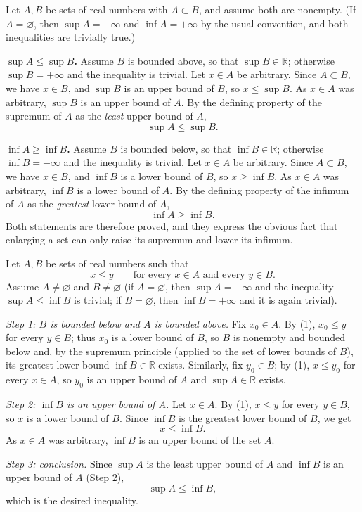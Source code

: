 \documentclass[11pt,a4paper]{article}
\newenvironment{solution}[1]{%
  \par\addvspace{1.7ex}%
  \noindent{\color{solutioncolor}\textbf{#1}}\hspace{0.55em}\ignorespaces}%
  {\par\addvspace{0.9ex}}
\begin{document}
\begin{solution}{Solution 2.4.9}\label{xs:2.4.9}
Let $A, B$ be sets of real numbers with $A \subset B$, and assume both are nonempty. (If $A = \varnothing$, then $\sup A = -\infty$ and $\inf A = +\infty$ by the usual convention, and both inequalities are trivially true.)

\medskip
\noindent\textbf{$\sup A \le \sup B$.} Assume $B$ is bounded above, so that $\sup B \in \mathbb{R}$; otherwise $\sup B = +\infty$ and the inequality is trivial. Let $x \in A$ be arbitrary. Since $A \subset B$, we have $x \in B$, and $\sup B$ is an upper bound of $B$, so $x \le \sup B$. As $x \in A$ was arbitrary, $\sup B$ is an upper bound of $A$. By the defining property of the supremum of $A$ as the \emph{least} upper bound of $A$,
\[
\sup A \le \sup B .
\]

\medskip
\noindent\textbf{$\inf A \ge \inf B$.} Assume $B$ is bounded below, so that $\inf B \in \mathbb{R}$; otherwise $\inf B = -\infty$ and the inequality is trivial. Let $x \in A$ be arbitrary. Since $A \subset B$, we have $x \in B$, and $\inf B$ is a lower bound of $B$, so $x \ge \inf B$. As $x \in A$ was arbitrary, $\inf B$ is a lower bound of $A$. By the defining property of the infimum of $A$ as the \emph{greatest} lower bound of $A$,
\[
\inf A \ge \inf B .
\]
Both statements are therefore proved, and they express the obvious fact that enlarging a set can only raise its supremum and lower its infimum.
\end{solution}

\begin{solution}{Solution 2.4.10}\label{xs:2.4.10}
Let $A, B$ be sets of real numbers such that
\[
x \le y \qquad \text{for every } x \in A \text{ and every } y \in B. \tag{1}
\]
Assume $A \ne \varnothing$ and $B \ne \varnothing$ (if $A = \varnothing$, then $\sup A = -\infty$ and the inequality $\sup A \le \inf B$ is trivial; if $B = \varnothing$, then $\inf B = +\infty$ and it is again trivial).

\emph{Step 1: $B$ is bounded below and $A$ is bounded above.} Fix $x_0 \in A$. By (1), $x_0 \le y$ for every $y \in B$; thus $x_0$ is a lower bound of $B$, so $B$ is nonempty and bounded below and, by the supremum principle (applied to the set of lower bounds of $B$), its greatest lower bound $\inf B \in \mathbb{R}$ exists. Similarly, fix $y_0 \in B$; by (1), $x \le y_0$ for every $x \in A$, so $y_0$ is an upper bound of $A$ and $\sup A \in \mathbb{R}$ exists.

\emph{Step 2: $\inf B$ is an upper bound of $A$.} Let $x \in A$. By (1), $x \le y$ for every $y \in B$, so $x$ is a lower bound of $B$. Since $\inf B$ is the greatest lower bound of $B$, we get
\[
x \le \inf B .
\]
As $x \in A$ was arbitrary, $\inf B$ is an upper bound of the set $A$.

\emph{Step 3: conclusion.} Since $\sup A$ is the least upper bound of $A$ and $\inf B$ is an upper bound of $A$ (Step 2),
\[
\sup A \le \inf B ,
\]
which is the desired inequality.
\end{solution}
\end{document}

